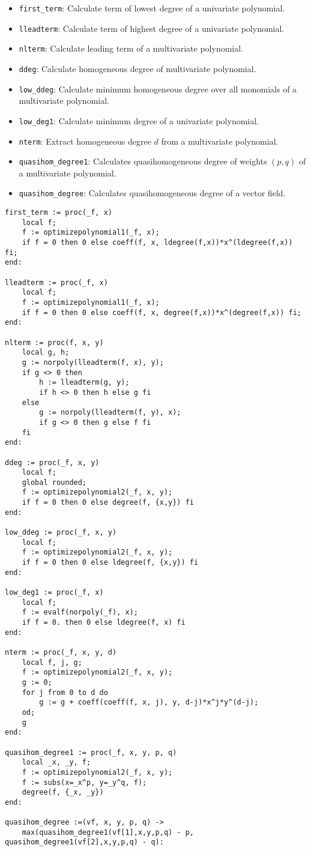 \documentclass[a4paper,10pt]{article}
\begin{document}
\begin{itemize}
\item   \verb+first_term+:   Calculate term of lowest degree of a univariate polynomial.
\item   \verb+lleadterm+:    Calculate term of highest degree of a univariate polynomial.
\item   \verb+nlterm+:       Calculate leading term of a multivariate polynomial.
\item   \verb+ddeg+:         Calculate homogeneous degree of multivariate polynomial.
\item   \verb+low_ddeg+:    Calculate minimum homogeneous degree over all monomials of a multivariate polynomial.
\item   \verb+low_deg1+:     Calculate minimum degree of a univariate polynomial.
\item   \verb+nterm+:       Extract homogeneous degree $d$ from a multivariate polynomial.
\item   \verb+quasihom_degree1+: Calculates quasihomogeneous degree of weights $(p,q)$ of a multivariate polynomial.
\item   \verb+quasihom_degree+: Calculates quasihomogeneous degree of a vector field.
\end{itemize}

\begin{lstlisting}[name=tools]
first_term := proc(_f, x)
    local f;
    f := optimizepolynomial1(_f, x);
    if f = 0 then 0 else coeff(f, x, ldegree(f,x))*x^(ldegree(f,x)) fi;
end:

lleadterm := proc(_f, x)
    local f;
    f := optimizepolynomial1(_f, x);
    if f = 0 then 0 else coeff(f, x, degree(f,x))*x^(degree(f,x)) fi;
end:

nlterm := proc(f, x, y)
    local g, h;
    g := norpoly(lleadterm(f, x), y);
    if g <> 0 then
        h := lleadterm(g, y);
        if h <> 0 then h else g fi
    else
        g := norpoly(lleadterm(f, y), x);
        if g <> 0 then g else f fi
    fi
end:

ddeg := proc(_f, x, y)
    local f;
    global rounded;
    f := optimizepolynomial2(_f, x, y);
    if f = 0 then 0 else degree(f, {x,y}) fi
end:

low_ddeg := proc(_f, x, y)
    local f;
    f := optimizepolynomial2(_f, x, y);
    if f = 0 then 0 else ldegree(f, {x,y}) fi
end:

low_deg1 := proc(_f, x)
    local f;
    f := evalf(norpoly(_f), x);
    if f = 0. then 0 else ldegree(f, x) fi
end:

nterm := proc(_f, x, y, d)
    local f, j, g;
    f := optimizepolynomial2(_f, x, y);
    g := 0;
    for j from 0 to d do
        g := g + coeff(coeff(f, x, j), y, d-j)*x^j*y^(d-j);
    od;
    g
end:

quasihom_degree1 := proc(_f, x, y, p, q)
    local _x, _y, f;
    f := optimizepolynomial2(_f, x, y);
    f := subs(x=_x^p, y=_y^q, f);
    degree(f, {_x, _y})
end:

quasihom_degree :=(vf, x, y, p, q) ->
    max(quasihom_degree1(vf[1],x,y,p,q) - p, quasihom_degree1(vf[2],x,y,p,q) - q):
\end{lstlisting}
\end{document}
